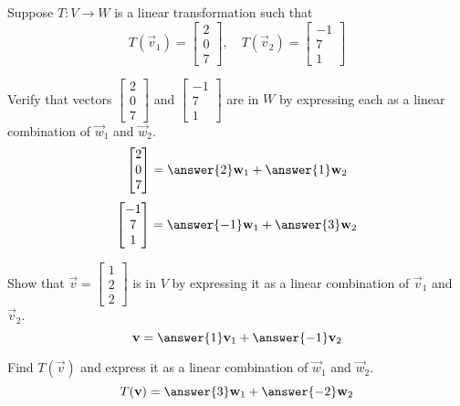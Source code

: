 \documentclass{ximera}
\begin{document}
\begin{problem}
Suppose $T:V\rightarrow W$ is a linear transformation such that 
$$T(\vec{v}_1)=\begin{bmatrix}2\\0\\7\end{bmatrix},\quad T(\vec{v}_2)=\begin{bmatrix}-1\\7\\1\end{bmatrix}$$
  \begin{problem}\label{prob:lintransandbasis1}
  Verify that vectors $\begin{bmatrix}2\\0\\7\end{bmatrix}$ and $\begin{bmatrix}-1\\7\\1\end{bmatrix}$ are in $W$ by expressing each as a linear combination of $\vec{w}_1$ and $\vec{w}_2$.
  $$\begin{bmatrix}2\\0\\7\end{bmatrix}=\answer{2}\vec{w}_1+\answer{1}\vec{w}_2$$
  $$\begin{bmatrix}-1\\7\\1\end{bmatrix}=\answer{-1}\vec{w}_1+\answer{3}\vec{w}_2$$
  \end{problem}
  
  \begin{problem}\label{prob:lintransandbasis2}
  Show that $\vec{v}=\begin{bmatrix}1\\2\\2\end{bmatrix}$ is in $V$ by expressing it as a linear combination of $\vec{v}_1$ and $\vec{v}_2$.
  $$\vec{v}=\answer{1}\vec{v}_1+\answer{-1}\vec{v}_2$$
  \end{problem}
  
  \begin{problem}\label{prob:lintransandbasis3}
  Find $T(\vec{v})$ and express it as a linear combination of $\vec{w}_1$ and $\vec{w}_2$.
  $$T(\vec{v})=\answer{3}\vec{w}_1+\answer{-2}\vec{w}_2$$
  \end{problem}
  \end{problem}
\end{document}
